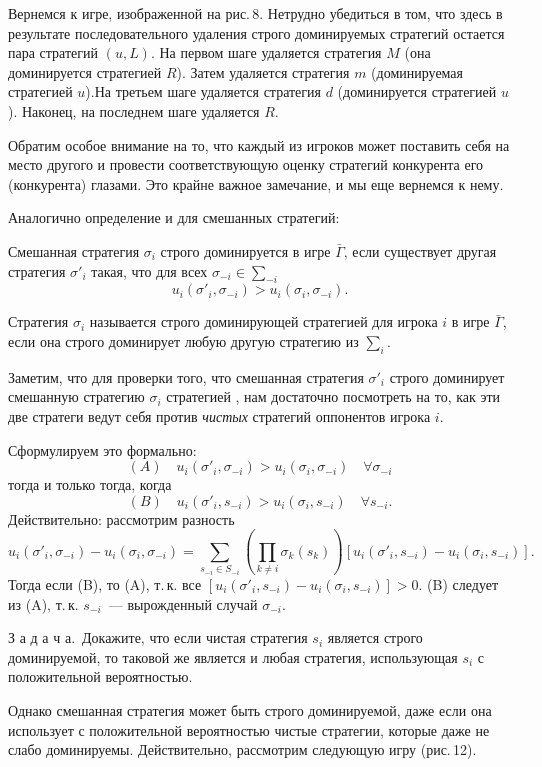\documentclass[12pt]{article}
\begin{document}
Вернемся к игре, изображенной на рис.\,8. Нетрудно убедиться в том,
что здесь в результате последовательного удаления строго
доминируемых стратегий остается пара стратегий $(u,L)$. На первом
шаге удаляется стратегия $M$ (она доминируется стратегией $R$).
Затем удаляется стратегия $m$ (доминируемая стратегией $u$).На
третьем шаге удаляется стратегия $d$ (доминируется стратегией $u$).
Наконец, на последнем шаге удаляется $R$.

Обратим особое внимание на то, что каждый из игроков может
поставить себя на место другого и провести соответствующую оценку
стратегий конкурента его (конкурента) глазами. Это крайне важное
замечание, и мы еще вернемся к нему.

Аналогично определение и для смешанных стратегий:

\begin{definition}
Смешанная стратегия  $\sigma_i$ строго доминируется в игре
$\bar\Gamma$, если существует другая стратегия $\sigma'_i$ такая,
что для всех $\sigma_{-i}\in\sum_{-i}$
$$
u_i(\sigma'_i,\sigma_{-i})>u_i(\sigma_i,\sigma_{-i}).
$$
\end{definition}

Стратегия $\sigma_i$ называется строго доминирующей стратегией для
игрока $i$ в игре $\bar\Gamma$, если она строго доминирует любую
другую стратегию из $\sum_i$.

Заметим, что для проверки того, что смешанная стратегия $\sigma'_i$
строго доминирует смешанную стратегию $\sigma_i$ стратегией , нам
достаточно посмотреть на то, как эти две стратеги ведут себя против
{\it чистых} стратегий оппонентов игрока $i$.

Сформулируем это формально:
$$
(A)\quad u_i(\sigma'_i,\sigma_{-i})>u_i
(\sigma_i,\sigma_{-i})\quad\forall\sigma_{-i}
$$
тогда и только тогда, когда
$$
(B)\quad u_i(\sigma'_i,s_{-i})>u_i (\sigma_i,s_{-i})\quad\forall
s_{-i}.
$$
Действительно: рассмотрим разность
$$
u_i(\sigma'_i,\sigma_{-i})-u_i
(\sigma_i,\sigma_{-i})=\sum_{s_{-i}\in S_{-i}} (\prod_{k\ne
i}\sigma_k(s_k))[u_i (\sigma'_i,s_{-i})-u_i(\sigma_i,s_{-i})].
$$
Тогда если (B), то (A), т.\,к. все
$[u_i(\sigma'_i,s_{-i})-u_i(\sigma_i,s_{-i})]>0$.  (B) следует из
(A), т.\,к. $s_{-i}$~--- вырожденный случай $\sigma_{-i}$.

З а д а ч а.\, Докажите, что если чистая стратегия $s_i$ является
строго доминируемой, то таковой же является и любая стратегия,
использующая $s_i$ с положительной вероятностью.

Однако смешанная стратегия может быть строго доминируемой, даже если
она использует с положительной вероятностью чистые стратегии,
которые даже не слабо доминируемы. Действительно, рассмотрим
следующую игру (рис.\,12).
\end{document}
